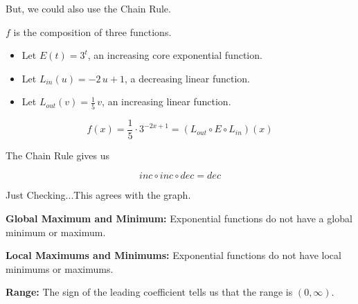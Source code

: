 \documentclass{ximera}
\begin{document}
\begin{example}
But, we could also use the Chain Rule.

$f$ is the composition of three functions.

\begin{itemize}
\item Let $E(t) = 3^t$, an increasing core exponential function.
\item Let $L_{in}(u) = -2 \, u + 1 $, a decreasing linear function.
\item Let $L_{out}(v) = \frac{1}{5} \, v$, an increasing linear function.
\end{itemize}



\[  f(x) = \frac{1}{5} \cdot 3^{-2x+1} =  (L_{out} \circ E \circ L_{in})(x) \]

The Chain Rule gives us


\[ inc \circ inc \circ dec = dec  \]


Just Checking...This agrees with the graph.



\textbf{Global Maximum and Minimum:} Exponential functions do not have a global minimum or maximum.




\textbf{Local Maximums and Minimums:} Exponential functions do not have local minimums or maximums.


\textbf{Range:} The sign of the leading coefficient tells us that the range is $(0, \infty)$.




\end{example}
\end{document}
